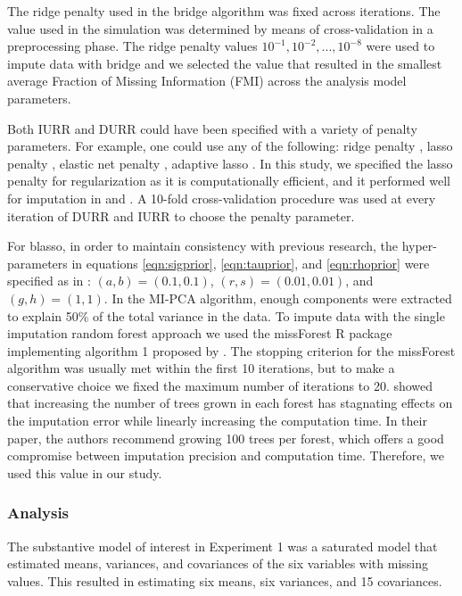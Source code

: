 	The ridge penalty used in the bridge algorithm was fixed across iterations.
	The value used in the simulation was determined by means of cross-validation in a preprocessing phase.
	The ridge penalty values $10^{-1}, 10^{-2}, ..., 10^{-8}$ were used to impute data with bridge
	and we selected the value that resulted in the smallest average Fraction of Missing Information (FMI)
	\citep[eq. 3.1.10]{rubin:1987} across the analysis model parameters.
		
	Both IURR and DURR could have been specified with a variety of penalty parameters.
	For example, one could use any of the following: ridge penalty \citep{hoerlKennard:1970}, lasso penalty 
	\citep{tibshirani:1996}, elastic net penalty \citep{zouHastie:2005}, adaptive lasso \citep{zou:2006}.
	In this study, we specified the lasso penalty for regularization as it is computationally efficient, 
	and it performed well for imputation in \cite{zhaoLong:2016} and \cite{dengEtAl:2016}.
	A 10-fold cross-validation procedure was used at every iteration of DURR and IURR to choose the penalty parameter.

	For blasso, in order to maintain consistency with previous research, the hyper-parameters in equations 
	\eqref{eqn:sigprior}, \eqref{eqn:tauprior}, and \eqref{eqn:rhoprior} were specified as in \cite{zhaoLong:2016}: 
	$(a,b)=(0.1, 0.1)$, $(r,s)=(0.01, 0.01)$, and $(g,h)=(1,1)$.
	In the MI-PCA algorithm, enough components were extracted to explain 50\% of the total variance in the data.
	To impute data with the single imputation random forest approach we used the missForest R package 
	\citep{missForest} implementing algorithm 1 proposed by \cite{stekhovenBuhlmann:2011}.
	The stopping criterion for the missForest algorithm was usually met within the first 10 iterations, 
	but to make a conservative choice we fixed the maximum number of iterations to 20.
	\cite{stekhovenBuhlmann:2011} showed that increasing the number of trees grown in each forest has 
	stagnating effects on the imputation error while linearly increasing the computation time.
	In their paper, the authors recommend growing 100 trees per forest, which offers a good compromise 
	between imputation precision and computation time.
	Therefore, we used this value in our study.

\subsubsection{Analysis}
	The substantive model of interest in Experiment 1 was a saturated model that estimated means,
	variances, and covariances of the six variables with missing values.
	This resulted in estimating six means, six variances, and 15 covariances.

